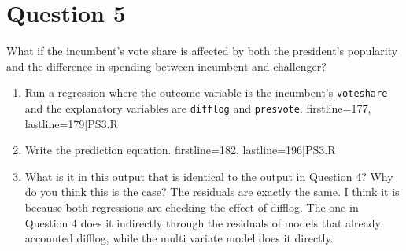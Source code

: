 \documentclass[12pt,letterpaper]{article}
\begin{document}
\section*{Question 5}
\noindent What if the incumbent's vote share is affected by both the president's popularity and the difference in spending between incumbent and challenger? 
	\begin{enumerate}
		\item Run a regression where the outcome variable is the incumbent's \texttt{voteshare} and the explanatory variables are \texttt{difflog} and \texttt{presvote}.	\vspace{0.2cm}
		 firstline=177, lastline=179]{PS3.R}
		\item Write the prediction equation.	\vspace{0.2cm}
		 firstline=182, lastline=196]{PS3.R}
		\item What is it in this output that is identical to the output in Question 4? Why do you think this is the case?
		\noindent The residuals are exactly the same. I think it is because both regressions are checking the effect of difflog. The one in Question 4 does it indirectly through the residuals of models that already accounted difflog, while the multi variate model does it directly. \\
	\end{enumerate}
\end{document}
